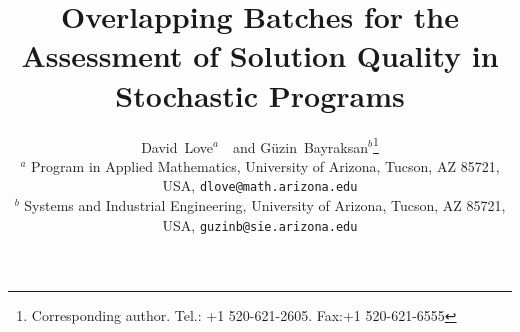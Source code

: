 \documentclass{article}
\begin{document}
\title{Overlapping Batches for the Assessment of Solution Quality in Stochastic Programs}

\author{David~Love$^{a}$\ \ and G\"{u}zin~Bayraksan$^{b}$\thanks{Corresponding author. Tel.: +1 520-621-2605. Fax:+1 520-621-6555}\\[6pt]
{\small
      $^{a}$ Program in Applied Mathematics, University of Arizona, Tucson, AZ 85721, USA, \texttt{dlove@math.arizona.edu}} \\
{\small 
      $^{b}$ Systems and Industrial Engineering, University of Arizona, Tucson, AZ 85721, USA, \texttt{guzinb@sie.arizona.edu}}}



\date{}

\maketitle
\end{document}

